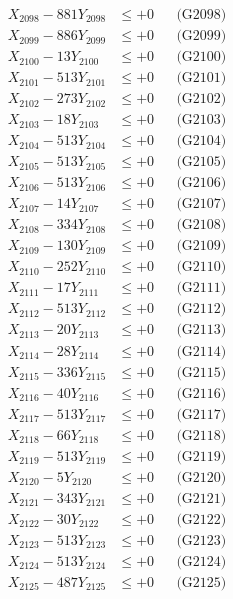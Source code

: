 \documentclass[a4paper,10pt]{article}
\begin{document}
{\begin{align}
X_{2098} - 881Y_{2098} &\leq +0 && \text{(G2098)} \\
X_{2099} - 886Y_{2099} &\leq +0 && \text{(G2099)} \\
X_{2100} - 13Y_{2100} &\leq +0 && \text{(G2100)} \\
\allowbreak
X_{2101} - 513Y_{2101} &\leq +0 && \text{(G2101)} \\
X_{2102} - 273Y_{2102} &\leq +0 && \text{(G2102)} \\
X_{2103} - 18Y_{2103} &\leq +0 && \text{(G2103)} \\
X_{2104} - 513Y_{2104} &\leq +0 && \text{(G2104)} \\
X_{2105} - 513Y_{2105} &\leq +0 && \text{(G2105)} \\
X_{2106} - 513Y_{2106} &\leq +0 && \text{(G2106)} \\
X_{2107} - 14Y_{2107} &\leq +0 && \text{(G2107)} \\
X_{2108} - 334Y_{2108} &\leq +0 && \text{(G2108)} \\
X_{2109} - 130Y_{2109} &\leq +0 && \text{(G2109)} \\
X_{2110} - 252Y_{2110} &\leq +0 && \text{(G2110)} \\
\allowbreak
X_{2111} - 17Y_{2111} &\leq +0 && \text{(G2111)} \\
X_{2112} - 513Y_{2112} &\leq +0 && \text{(G2112)} \\
X_{2113} - 20Y_{2113} &\leq +0 && \text{(G2113)} \\
X_{2114} - 28Y_{2114} &\leq +0 && \text{(G2114)} \\
X_{2115} - 336Y_{2115} &\leq +0 && \text{(G2115)} \\
X_{2116} - 40Y_{2116} &\leq +0 && \text{(G2116)} \\
X_{2117} - 513Y_{2117} &\leq +0 && \text{(G2117)} \\
X_{2118} - 66Y_{2118} &\leq +0 && \text{(G2118)} \\
X_{2119} - 513Y_{2119} &\leq +0 && \text{(G2119)} \\
X_{2120} - 5Y_{2120} &\leq +0 && \text{(G2120)} \\
\allowbreak
X_{2121} - 343Y_{2121} &\leq +0 && \text{(G2121)} \\
X_{2122} - 30Y_{2122} &\leq +0 && \text{(G2122)} \\
X_{2123} - 513Y_{2123} &\leq +0 && \text{(G2123)} \\
X_{2124} - 513Y_{2124} &\leq +0 && \text{(G2124)} \\
X_{2125} - 487Y_{2125} &\leq +0 && \text{(G2125)} \\

\end{align}}
\end{document}
